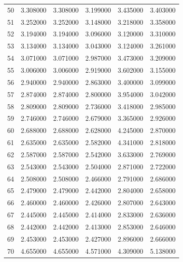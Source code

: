 \begin{tabular}{lrrrrr}
50 & 3.308000 & 3.308000 & 3.199000 & 3.435000 & 3.403000 \\
51 & 3.252000 & 3.252000 & 3.148000 & 3.218000 & 3.358000 \\
52 & 3.194000 & 3.194000 & 3.096000 & 3.120000 & 3.310000 \\
53 & 3.134000 & 3.134000 & 3.043000 & 3.124000 & 3.261000 \\
54 & 3.071000 & 3.071000 & 2.987000 & 3.473000 & 3.209000 \\
55 & 3.006000 & 3.006000 & 2.919000 & 3.602000 & 3.155000 \\
56 & 2.940000 & 2.940000 & 2.863000 & 3.400000 & 3.099000 \\
57 & 2.874000 & 2.874000 & 2.800000 & 3.954000 & 3.042000 \\
58 & 2.809000 & 2.809000 & 2.736000 & 3.418000 & 2.985000 \\
59 & 2.746000 & 2.746000 & 2.679000 & 3.365000 & 2.926000 \\
60 & 2.688000 & 2.688000 & 2.628000 & 4.245000 & 2.870000 \\
61 & 2.635000 & 2.635000 & 2.582000 & 4.341000 & 2.818000 \\
62 & 2.587000 & 2.587000 & 2.542000 & 3.633000 & 2.769000 \\
63 & 2.543000 & 2.543000 & 2.504000 & 2.871000 & 2.722000 \\
64 & 2.508000 & 2.508000 & 2.466000 & 2.791000 & 2.686000 \\
65 & 2.479000 & 2.479000 & 2.442000 & 2.804000 & 2.658000 \\
66 & 2.460000 & 2.460000 & 2.426000 & 2.807000 & 2.643000 \\
67 & 2.445000 & 2.445000 & 2.414000 & 2.833000 & 2.636000 \\
68 & 2.442000 & 2.442000 & 2.413000 & 2.853000 & 2.646000 \\
69 & 2.453000 & 2.453000 & 2.427000 & 2.896000 & 2.666000 \\
70 & 4.655000 & 4.655000 & 4.571000 & 4.309000 & 5.138000 \\
\bottomrule
\end{tabular}
